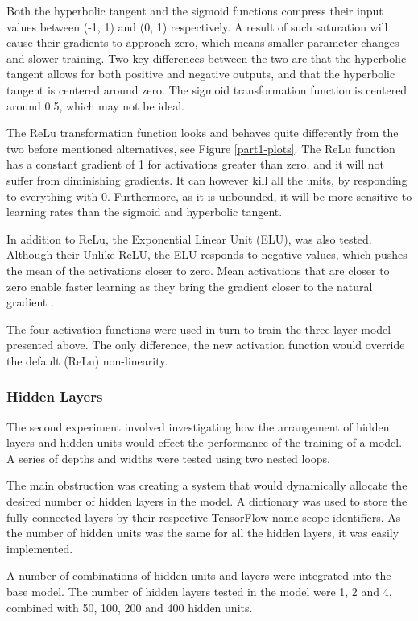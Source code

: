\documentclass[]{article}
\begin{document}
Both the hyperbolic tangent and the sigmoid functions compress their input values between (-1, 1) and (0, 1) respectively. A result of such saturation will cause their gradients to approach zero, which means smaller parameter changes and slower training. Two key differences between the two are that the hyperbolic tangent allows for both positive and negative outputs, and that the hyperbolic tangent is centered around zero. The sigmoid transformation function is centered around 0.5, which may not be ideal.

The ReLu transformation function looks and behaves quite differently from the two before mentioned alternatives, see Figure \ref{part1-plots}. The ReLu function has a constant gradient of 1 for activations greater than zero, and it will not suffer from diminishing gradients. It can however kill all the units, by responding to everything with 0. Furthermore, as it is unbounded, it will be more sensitive to learning rates than the sigmoid and hyperbolic tangent.

In addition to ReLu, the Exponential Linear Unit (ELU), was also tested. Although their   Unlike ReLU, the ELU responds to negative values, which pushes the mean of the activations closer to zero. Mean activations that are closer to zero enable faster learning as they bring the gradient closer to the natural gradient  \cite{elu}.

The four activation functions were used in turn to train the three-layer model presented above. The only difference, the new activation function would override the default (ReLu) non-linearity. 

\subsubsection{Hidden Layers}

The second experiment involved investigating how the arrangement of hidden layers and hidden units would effect the performance of the training of a model. A series of depths and widths were tested using two nested loops. 

The main obstruction was creating a system that would dynamically allocate the desired number of hidden layers in the model. A dictionary was used to store the fully connected layers by their respective TensorFlow name scope identifiers. As the number of hidden units was the same for all the hidden layers, it was easily implemented. 

A number of combinations of hidden units and layers were integrated into the base model. The number of hidden layers tested in the model were 1, 2 and 4, combined with 50, 100, 200 and 400 hidden units. 
\end{document}
